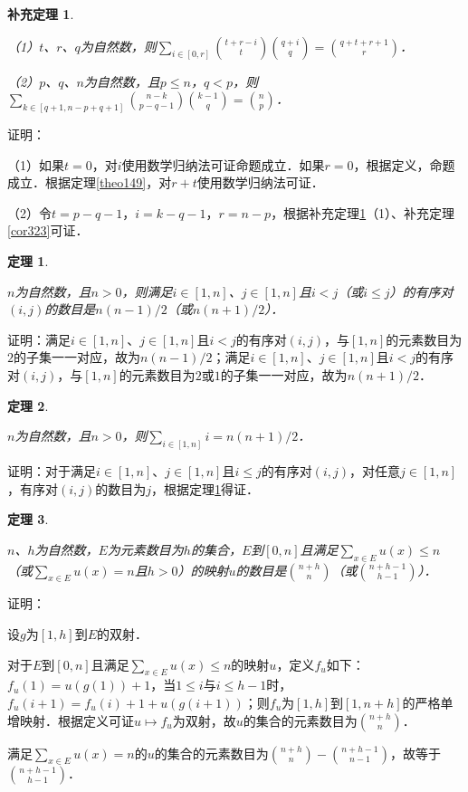 \documentclass[12pt, a4paper, oneside]{book}
\newtheorem{theo}{定理}
\newtheorem{cor}{补充定理}
\begin{document}
			\begin{cor}\label{cor328}
				\hfill\par
				（1）$t$、$r$、$q$为自然数，则$\sum\limits_{i\in [0, r]}\binom{t+r-i}{t}\binom{q+i}{q}=\binom{q+t+r+1}{r}$．
				\par
				（2）$p$、$q$、$n$为自然数，且$p\leq n$，$q<p$，则$\sum\limits_{k\in [q+1, n-p+q+1]}\binom{n-k}{p-q-1}\binom{k-1}{q}=\binom{n}{p}$．
			\end{cor}
			证明：
			\par
			（1）如果$t=0$，对$i$使用数学归纳法可证命题成立．如果$r=0$，根据定义，命题成立．根据定理\ref{theo149}，对$r+t$使用数学归纳法可证．
			\par
			（2）令$t=p-q-1$，$i=k-q-1$，$r=n-p$，根据补充定理\ref{cor328}（1）、补充定理\ref{cor323}可证．
			
			\begin{theo}\label{theo150}
				\hfill\par
				$n$为自然数，且$n>0$，则满足$i\in [1, n]$、$j\in [1, n]$且$i<j$（或$i\leq j$）的有序对$(i, j)$的数目是$n(n-1)/2$（或$n(n+1)/2$）．
			\end{theo}
			证明：满足$i\in [1, n]$、$j\in [1, n]$且$i<j$的有序对$(i, j)$，与$[1, n]$的元素数目为$2$的子集一一对应，故为$n(n-1)/2$；满足$i\in [1, n]$、$j\in [1, n]$且$i<j$的有序对$(i, j)$，与$[1, n]$的元素数目为$2$或$1$的子集一一对应，故为$n(n+1)/2$．
			
			\begin{theo}\label{theo151}
				\hfill\par
				$n$为自然数，且$n>0$，则$\sum\limits_{i\in [1, n]}i=n(n+1)/2$．
			\end{theo}
			证明：对于满足$i\in [1, n]$、$j\in [1, n]$且$i\leq j$的有序对$(i, j)$，对任意$j\in [1, n]$，有序对$(i, j)$的数目为$j$，根据定理\ref{theo150}得证．
			
			\begin{theo}\label{theo152}
				\hfill\par
				$n$、$h$为自然数，$E$为元素数目为$h$的集合，$E$到$[0, n]$且满足$\sum\limits_{x\in E}u(x)\leq n$（或$\sum\limits_{x\in E}u(x)=n$且$h>0$）的映射$u$的数目是$\binom{n+h}{n}$（或$\binom{n+h-1}{h-1}$）．
			\end{theo}
			证明：
			\par
			设$g$为$[1, h]$到$E$的双射．
			\par
			对于$E$到$[0, n]$且满足$\sum\limits_{x\in E}u(x)\leq n$的映射$u$，定义$f_u$如下：$f_u(1)=u(g(1))+1$，当$1\leq i\text{与}i\leq h-1$时，$f_u(i+1)=f_u(i)+1+u(g(i+1))$；则$f_u$为$[1, h]$到$[1, n+h]$的严格单增映射．根据定义可证$u\mapsto f_u$为双射，故$u$的集合的元素数目为$\binom{n+h}{n}$．
			\par
			满足$\sum\limits_{x\in E}u(x)=n$的$u$的集合的元素数目为$\binom{n+h}{n}-\binom{n+h-1}{n-1}$，故等于$\binom{n+h-1}{h-1}$．
			
\end{document}
